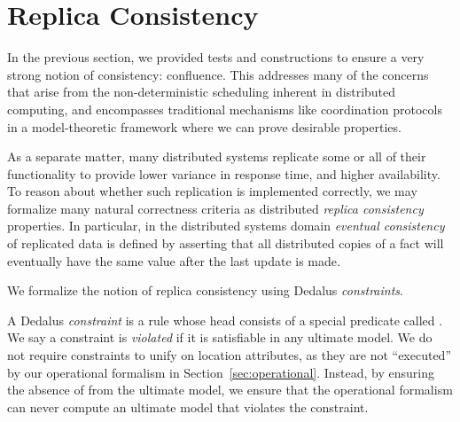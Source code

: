 \section{Replica Consistency}
\label{sec:consistency}

In the previous section, we provided tests and constructions to ensure a very strong notion of consistency: confluence.  This addresses many of the concerns that arise from the non-deterministic scheduling inherent in distributed computing, and encompasses traditional mechanisms like coordination protocols in a model-theoretic framework where we can prove desirable properties.

As a separate matter, many distributed systems replicate some or all of their functionality to provide lower variance in response time, and higher availability.  
To reason about whether such replication is implemented correctly, we may formalize many
natural correctness criteria as distributed {\em replica consistency} properties.
In particular, in the distributed systems domain {\em eventual consistency} of replicated data is defined by asserting that all distributed copies of a fact will eventually have the same value after the last update is made. 

We formalize the notion of replica consistency using Dedalus {\em constraints}.  

\begin{definition}
A Dedalus {\em constraint} is a rule whose head consists of a special predicate called .  We say a constraint is {\em violated} if it is satisfiable in any ultimate model.  We do not require constraints to unify on location attributes, as they are not ``executed'' by our operational formalism in Section~\ref{sec:operational}.  Instead, by ensuring the absence of  from the ultimate model, we ensure that the operational formalism can never compute an ultimate model that violates the constraint.
\end{definition}

